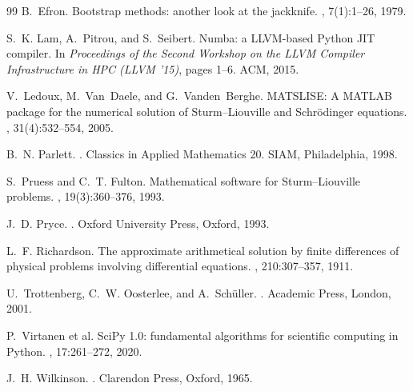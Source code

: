 \documentclass[twocolumn,10pt,a4paper]{article}
\theoremstyle{plain}
\theoremstyle{definition}
\begin{document}
\begin{thebibliography}{99}
B.~Efron.
\newblock Bootstrap methods: another look at the jackknife.
, 7(1):1--26, 1979.

S.~K. Lam, A.~Pitrou, and S.~Seibert.
\newblock Numba: a LLVM-based Python JIT compiler.
\newblock In {\em Proceedings of the Second Workshop on the LLVM Compiler
Infrastructure in HPC (LLVM '15)}, pages 1--6. ACM, 2015.

V.~Ledoux, M.~Van~Daele, and G.~Vanden~Berghe.
\newblock MATSLISE: A MATLAB package for the numerical solution of
Sturm--Liouville and Schr\"odinger equations.
, 31(4):532--554, 2005.

B.~N. Parlett.
.
\newblock Classics in Applied Mathematics 20. SIAM, Philadelphia, 1998.

S.~Pruess and C.~T. Fulton.
\newblock Mathematical software for Sturm--Liouville problems.
, 19(3):360--376, 1993.

J.~D. Pryce.
.
\newblock Oxford University Press, Oxford, 1993.

L.~F. Richardson.
\newblock The approximate arithmetical solution by finite differences of
physical problems involving differential equations.
,
210:307--357, 1911.

U.~Trottenberg, C.~W. Oosterlee, and A.~Sch\"uller.
.
\newblock Academic Press, London, 2001.

P.~Virtanen et al.
\newblock SciPy 1.0: fundamental algorithms for scientific computing in Python.
, 17:261--272, 2020.

J.~H. Wilkinson.
.
\newblock Clarendon Press, Oxford, 1965.

\end{thebibliography}
\end{document}
